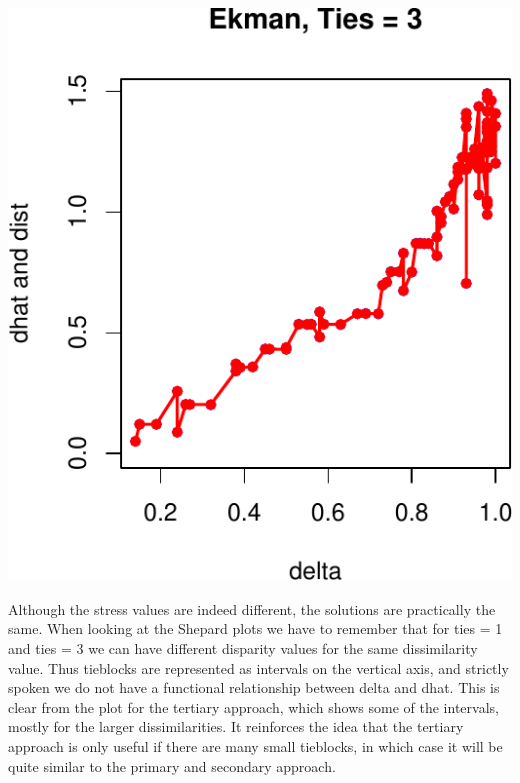 \documentclass[
  12pt,
]{article}
\begin{document}
\begin{center}\includegraphics{smacofRO_files/figure-latex/plotekman-3} \end{center}

Although the stress values are indeed different, the solutions are practically the same. When looking at the
Shepard plots we have to remember that for ties = 1 and ties = 3 we can have different disparity values for the
same dissimilarity value. Thus tieblocks are represented as intervals on the vertical axis, and strictly spoken we do not have a functional relationship between delta and dhat. This is clear from the plot for the
tertiary approach, which shows some of the intervals, mostly for the larger dissimilarities. It reinforces the
idea that the tertiary approach is only useful if there are many small tieblocks, in which case it will be quite similar to the primary and secondary approach.
\end{document}
